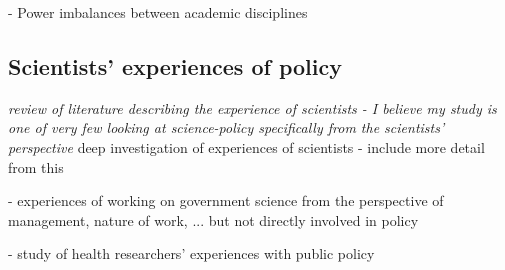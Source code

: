 \cite{BalvaneraJNOBCDGGKKMPSSW2020} - Power imbalances between academic disciplines

\subsection{Scientists’ experiences of policy}\label{sec:experiences}
\emph{review of literature describing the experience of scientists - I believe my study is one of very few looking at science-policy specifically from the scientists’ perspective}
\cite{OjanenBKP2021} deep investigation of experiences of scientists - include more detail from this

\cite{DanfordDR2009} - experiences of working on government science from the perspective of management, nature of work, ... but not directly involved in policy

\cite{KothariME2009} - study of health researchers' experiences with public policy




